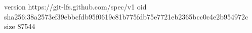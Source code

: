 version https://git-lfs.github.com/spec/v1
oid sha256:38a2573ef39ebbcfdb95f0619c81b775fdb75e7721eb2365bcc0c4e2b954972c
size 87544
